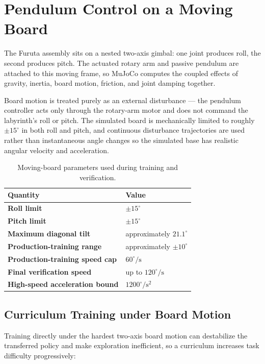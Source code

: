 \documentclass[9pt]{extarticle}
\begin{document}
\section{Pendulum Control on a Moving Board}

The Furuta assembly sits on a nested two-axis gimbal: one joint produces
roll, the second produces pitch. The actuated rotary arm and passive
pendulum are attached to this moving frame, so MuJoCo computes the coupled
effects of gravity, inertia, board motion, friction, and joint damping
together.

Board motion is treated purely as an external disturbance — the pendulum
controller acts only through the rotary-arm motor and does not command the
labyrinth's roll or pitch. The simulated board is mechanically limited to
roughly $\pm 15^\circ$ in both roll and pitch, and continuous disturbance
trajectories are used rather than instantaneous angle changes so the
simulated base has realistic angular velocity and acceleration.

\begin{table}[h]
\centering
\small
\caption{Moving-board parameters used during training and verification.}
\begin{tabularx}{0.78\linewidth}{>{\bfseries}X X}
\toprule
Quantity & Value \\
\midrule
Roll limit & $\pm 15^\circ$ \\
Pitch limit & $\pm 15^\circ$ \\
Maximum diagonal tilt & approximately $21.1^\circ$ \\
Production-training range & approximately $\pm 10^\circ$ \\
Production-training speed cap & $60^\circ/\mathrm{s}$ \\
Final verification speed & up to $120^\circ/\mathrm{s}$ \\
High-speed acceleration bound & $1200^\circ/\mathrm{s}^2$ \\
\bottomrule
\end{tabularx}
\end{table}



\subsection{Curriculum Training under Board Motion}

Training directly under the hardest two-axis board motion can destabilize
the transferred policy and make exploration inefficient, so a curriculum
increases task difficulty progressively:
\end{document}
